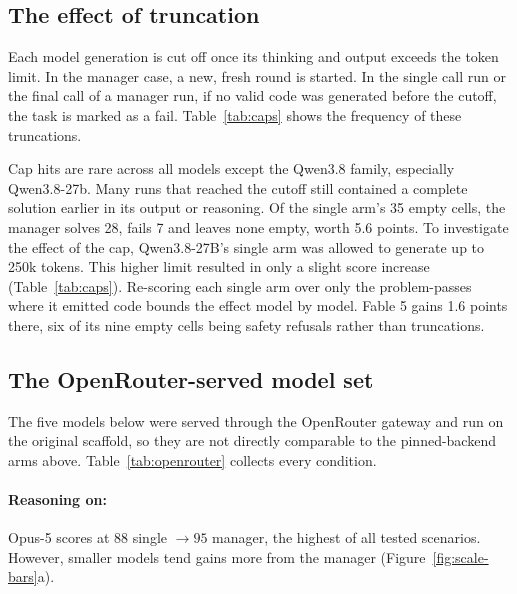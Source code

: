 \documentclass{article}
\begin{document}
\FloatBarrier
\subsection{The effect of truncation}
\label{sec:truncation}

Each model generation is cut off once its thinking and output exceeds the token limit. In the manager case, a new, fresh round is started. In the single call run or the final call of a manager run, if no valid code was generated before the cutoff, the task is marked as a fail. Table~\ref{tab:caps} shows the frequency of these truncations.




Cap hits are rare across all models except the Qwen3.8 family, especially Qwen3.8-27b. Many runs that reached the cutoff still contained a complete solution earlier in its output or reasoning.
Of the single arm's 35 empty cells, the manager
solves 28, fails 7 and leaves none empty, worth 5.6 points. To investigate the effect of the cap, Qwen3.8-27B's
single arm was allowed to generate up to 250k tokens. This higher limit resulted in only a slight score increase (Table~\ref{tab:caps}). Re-scoring each single arm over only the problem-passes
where it emitted code bounds the effect model by model. Fable 5
gains 1.6 points there, six of its nine empty cells being safety refusals rather than
truncations.

\subsection{The OpenRouter-served model set}
\label{sec:openrouter}

The five models below were served through the OpenRouter gateway and run on the original
scaffold, so they are not directly comparable to the pinned-backend arms above.
Table~\ref{tab:openrouter} collects every condition.

\paragraph{Reasoning on:} Opus-5 scores at $88$ single $\to 95$ manager, the highest of all tested scenarios. However, smaller models tend gains more from the manager (Figure~\ref{fig:scale-bars}a).
\end{document}
